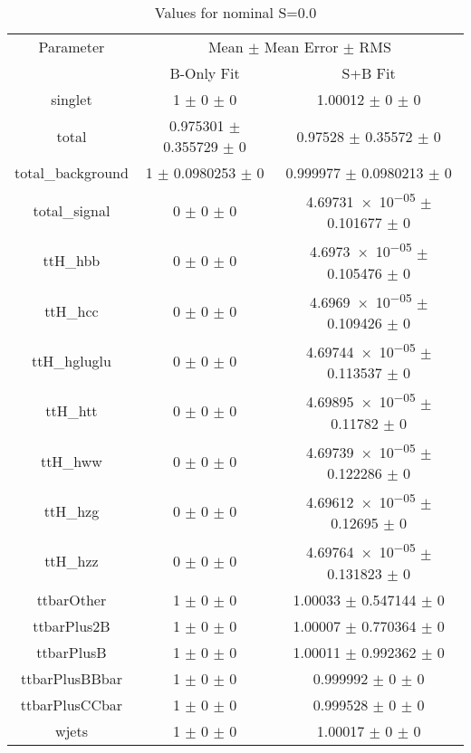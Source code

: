 \begin{table}
\centering
\caption{Values for nominal S=0.0}
\begin{tabular}{ccc}
\toprule
Parameter & \multicolumn{2}{c}{Mean $\pm$ Mean Error $\pm$ RMS}\\
 & B-Only Fit & S+B Fit\\
\midrule
singlet & \num{1} $\pm$ \num{0} $\pm$ \num{0} & \num{1.00012} $\pm$ \num{0} $\pm$ \num{0}\\
total & \num{0.975301} $\pm$ \num{0.355729} $\pm$ \num{0} & \num{0.97528} $\pm$ \num{0.35572} $\pm$ \num{0}\\
total\_background & \num{1} $\pm$ \num{0.0980253} $\pm$ \num{0} & \num{0.999977} $\pm$ \num{0.0980213} $\pm$ \num{0}\\
total\_signal & \num{0} $\pm$ \num{0} $\pm$ \num{0} & \num{4.69731e-05} $\pm$ \num{0.101677} $\pm$ \num{0}\\
ttH\_hbb & \num{0} $\pm$ \num{0} $\pm$ \num{0} & \num{4.6973e-05} $\pm$ \num{0.105476} $\pm$ \num{0}\\
ttH\_hcc & \num{0} $\pm$ \num{0} $\pm$ \num{0} & \num{4.6969e-05} $\pm$ \num{0.109426} $\pm$ \num{0}\\
ttH\_hgluglu & \num{0} $\pm$ \num{0} $\pm$ \num{0} & \num{4.69744e-05} $\pm$ \num{0.113537} $\pm$ \num{0}\\
ttH\_htt & \num{0} $\pm$ \num{0} $\pm$ \num{0} & \num{4.69895e-05} $\pm$ \num{0.11782} $\pm$ \num{0}\\
ttH\_hww & \num{0} $\pm$ \num{0} $\pm$ \num{0} & \num{4.69739e-05} $\pm$ \num{0.122286} $\pm$ \num{0}\\
ttH\_hzg & \num{0} $\pm$ \num{0} $\pm$ \num{0} & \num{4.69612e-05} $\pm$ \num{0.12695} $\pm$ \num{0}\\
ttH\_hzz & \num{0} $\pm$ \num{0} $\pm$ \num{0} & \num{4.69764e-05} $\pm$ \num{0.131823} $\pm$ \num{0}\\
ttbarOther & \num{1} $\pm$ \num{0} $\pm$ \num{0} & \num{1.00033} $\pm$ \num{0.547144} $\pm$ \num{0}\\
ttbarPlus2B & \num{1} $\pm$ \num{0} $\pm$ \num{0} & \num{1.00007} $\pm$ \num{0.770364} $\pm$ \num{0}\\
ttbarPlusB & \num{1} $\pm$ \num{0} $\pm$ \num{0} & \num{1.00011} $\pm$ \num{0.992362} $\pm$ \num{0}\\
ttbarPlusBBbar & \num{1} $\pm$ \num{0} $\pm$ \num{0} & \num{0.999992} $\pm$ \num{0} $\pm$ \num{0}\\
ttbarPlusCCbar & \num{1} $\pm$ \num{0} $\pm$ \num{0} & \num{0.999528} $\pm$ \num{0} $\pm$ \num{0}\\
wjets & \num{1} $\pm$ \num{0} $\pm$ \num{0} & \num{1.00017} $\pm$ \num{0} $\pm$ \num{0}\\
\bottomrule
\end{tabular}
\end{table}